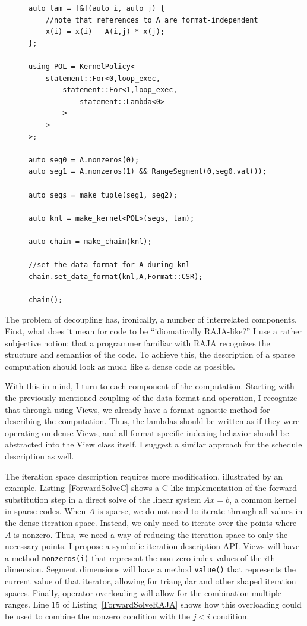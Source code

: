 \documentclass{article}
\begin{document}
\begin{figure}
\begin{lstlisting}[caption={Possible RAJA implementation of forward substitution.},label={ForwardSolveRAJA}]
auto lam = [&](auto i, auto j) {
    //note that references to A are format-independent
    x(i) = x(i) - A(i,j) * x(j);
};

using POL = KernelPolicy<
    statement::For<0,loop_exec,
        statement::For<1,loop_exec,
            statement::Lambda<0>
        >
    >
>;

auto seg0 = A.nonzeros(0);
auto seg1 = A.nonzeros(1) && RangeSegment(0,seg0.val());

auto segs = make_tuple(seg1, seg2);

auto knl = make_kernel<POL>(segs, lam);

auto chain = make_chain(knl);

//set the data format for A during knl
chain.set_data_format(knl,A,Format::CSR);

chain();

\end{lstlisting}
\end{figure}

The problem of decoupling has, ironically, a number of interrelated components.
First, what does it mean for code to be \enquote{idiomatically RAJA-like?}
I use a rather subjective notion: that a programmer familiar with RAJA recognizes the structure and semantics of the code. 
To achieve this, the description of a sparse computation should look as much like a dense code as possible. 

With this in mind, I turn to each component of the computation.
Starting with the previously mentioned coupling of the data format and operation, I recognize that through using Views, we already have a format-agnostic method for describing the computation. 
Thus, the lambdas should be written as if they were operating on dense Views, and all format specific indexing behavior should be abstracted into the View class itself. 
I suggest a similar approach for the schedule description as well.

The iteration space description requires more modification, illustrated by an example.
Listing~\ref{ForwardSolveC} shows a C-like implementation of the forward substitution step in a direct solve of the linear system $Ax=b$, a common kernel in sparse codes.
When $A$ is sparse, we do not need to iterate through all values in the dense iteration space.
Instead, we only need to iterate over the points where $A$ is nonzero. 
Thus, we need a way of reducing the iteration space to only the necessary points. 
I propose a symbolic iteration description API.
Views will have a method \verb.nonzeros(i). that represent the non-zero index values of the $i$th dimension. 
Segment dimensions will have a method \verb.value(). that represents the current value of that iterator, allowing for triangular and other shaped iteration spaces.
Finally, operator overloading will allow for the combination multiple ranges.
Line 15 of Listing~\ref{ForwardSolveRAJA} shows how this overloading could be used to combine the nonzero condition with the $j < i$ condition.
\end{document}

